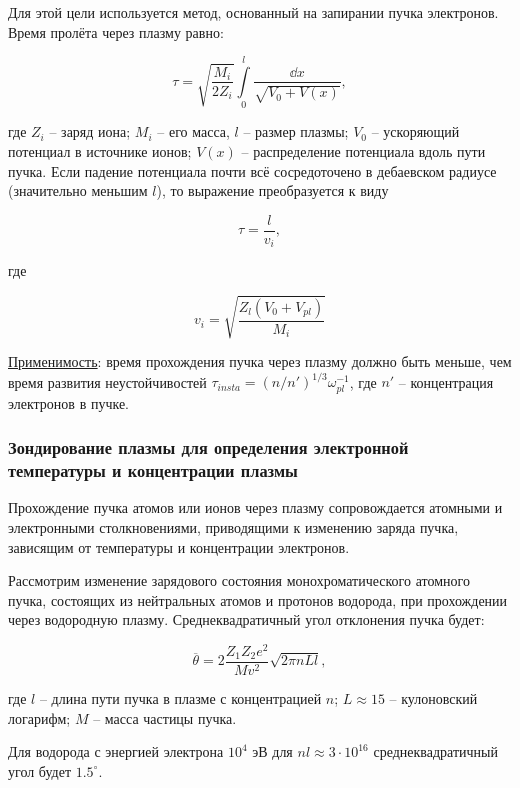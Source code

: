 \documentclass[10pt, a4paper]{article}
\begin{document}
Для этой цели используется метод, основанный на запирании пучка электронов. Время пролёта через плазму равно:

\begin{equation*}
	\tau = \sqrt{\frac{M_i}{2Z_i}} \int\limits_0^l \frac{\dd{x}}{\sqrt{V_0 +V(x)}},
\end{equation*}

где $Z_i$ -- заряд иона; $M_i$ -- его масса, $l$ -- размер плазмы; $V_0$ -- ускоряющий потенциал в источнике ионов; $V(x)$ -- распределение потенциала вдоль пути пучка. Если падение потенциала почти всё сосредоточено в дебаевском радиусе (значительно меньшим $l$), то выражение преобразуется к виду

\begin{equation*}
	\tau = \frac{l}{v_i},
\end{equation*}

где 

\begin{equation*}
	v_i= \sqrt{\frac{Z_l (V_0 + V_{pl})}{M_i}}
\end{equation*}

\uline{Применимость}: время прохождения пучка через плазму должно быть меньше, чем время развития неустойчивостей $\tau_{insta} =(n/n')^{1/3}\omega_{pl}^{-1}$, где $n'$ -- концентрация электронов в пучке.

\subsubsection{Зондирование плазмы для определения электронной температуры  и концентрации плазмы}

Прохождение пучка атомов или ионов через плазму сопровождается атомными и электронными столкновениями, приводящими к изменению заряда пучка, зависящим от температуры и концентрации электронов.

Рассмотрим изменение зарядового состояния монохроматического атомного пучка, состоящих из нейтральных атомов и протонов водорода, при прохождении через водородную плазму.
Среднеквадратичный угол отклонения пучка будет:

\begin{equation}
 \overline{\theta} = 2\frac{Z_1Z_2e^2}{M v^2}\sqrt{2\pi nLl},
\end{equation}

где $l$ -- длина пути пучка в плазме с концентрацией $n$; $L\approx 15$ -- кулоновский логарифм; $M$ -- масса частицы пучка.

Для водорода с энергией электрона $10^4$ эВ для $nl\approx3\cdot10^{16}$ среднеквадратичный угол будет $1.5^{\circ}$.
\end{document}
